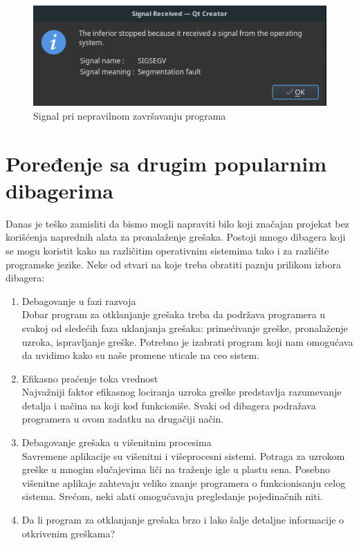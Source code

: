 \documentclass[a4paper]{article}
\begin{document}
\begin{figure}[h!]
\begin{center}
\includegraphics[scale=0.5]{signals.png}
\end{center}
\caption{Signal pri nepravilnom završavanju programa}
\label{fig:signals}
\end{figure}


\section{Poređenje sa drugim popularnim dibagerima}
\label{sec:poredjenje}
Danas je teško zamisliti da bismo mogli napraviti bilo koji značajan projekat bez korišćenja
naprednih alata za pronalaženje grešaka. Postoji mnogo dibagera koji se mogu koristit kako
na različitim operativnim sistemima tako i za različite programske jezike. 
Neke od stvari na koje treba obratiti paznju prilikom izbora dibagera:

\begin{enumerate}
\item Debagovanje u fazi razvoja \\
Dobar program za otklanjanje grešaka treba da podržava
programera u svakoj od sledećih faza uklanjanja grešaka:
primećivanje greške, pronalaženje uzroka, ispravljanje greške.
Potrebno je izabrati program koji nam omogućava da uvidimo kako
su naše promene uticale na ceo sistem.
\item Efikasno praćenje toka vrednost\\
Najvažniji faktor efikasnog lociranja uzroka greške predstavlja
razumevanje detalja i načina na koji kod funkcioniše. Svaki od
dibagera podražava programera u ovom zadatku na drugačiji način.
\item Debagovanje grešaka u višenitnim procesima\\
Savremene aplikacije su višenitni i višeprocesni sistemi. 
Potraga za uzrokom greške u mnogim slučajevima liči na traženje igle
u plastu sena. Posebno višenitne aplikaje zahtevaju veliko znanje
programera o funkcionisanju celog sistema.\cite{tools} 
Srećom, neki alati omogućavaju pregledanje pojedinačnih niti.
\item Da li program za otklanjanje grešaka brzo i lako šalje detaljne informacije o otkrivenim greškama?
\end{enumerate}
\end{document}
